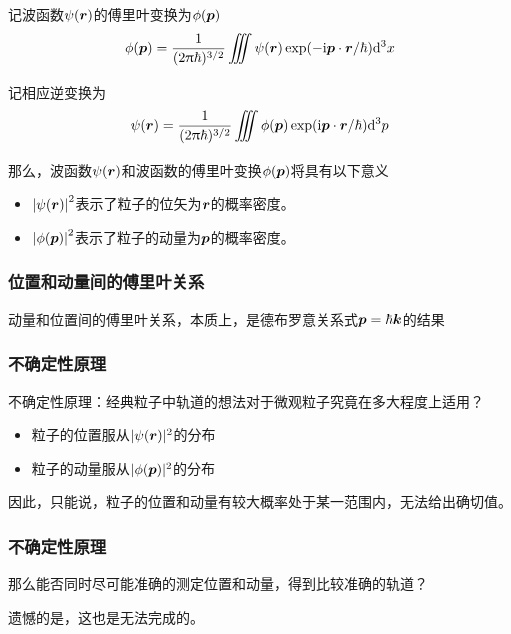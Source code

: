 \begin{frame}
    \begin{theorem}[波函数的傅里叶变换]
        \setlength{\parskip}{0pt}
        记波函数$\psi(\vb*{r})$的傅里叶变换为$\phi(\vb*{p})$
        \begin{equation}
            \phi(\vb*{p})=\frac{1}{(2\pi\hbar)^{3/2}}\Itnt\psi(\vb*{r})\exp(-\i\vb*{p}\cdot\vb*{r}/\hbar)\dd^3x
        \end{equation}
        记相应逆变换为
        \begin{equation}
            \psi(\vb*{r})=\frac{1}{(2\pi\hbar)^{3/2}}\Itnt\phi(\vb*{p})\exp(\i\vb*{p}\cdot\vb*{r}/\hbar)\dd^3p
        \end{equation}
        那么，波函数$\psi(\vb*{r})$和波函数的傅里叶变换$\phi(\vb*{p})$将具有以下意义
        \begin{itemize}
            \item $\abs{\psi(\vb*{r})}^2$表示了粒子的位矢为$\vb*{r}$的概率密度。
            \item $\abs{\phi(\vb*{p})}^2$表示了粒子的动量为$\vb*{p}$的概率密度。
        \end{itemize}
    \end{theorem}
\end{frame}

\begin{frame}
    \frametitle{位置和动量间的傅里叶关系}
    动量和位置间的傅里叶关系，本质上，是德布罗意关系式$\vb*{p}=\hbar\vb*{k}$的结果
\end{frame}

\begin{frame}
    \frametitle{不确定性原理}
    不确定性原理：经典粒子中轨道的想法对于微观粒子究竟在多大程度上适用？

    \begin{itemize}
        \item 粒子的位置服从$|\psi(\vb*{r})|^2$的分布
        \item 粒子的动量服从$|\phi(\vb*{p})|^2$的分布
    \end{itemize}
    因此，只能说，粒子的位置和动量有较大概率处于某一范围内，无法给出确切值。
\end{frame}

\begin{frame}
    \frametitle{不确定性原理}
    那么能否同时尽可能准确的测定位置和动量，得到比较准确的轨道？

    遗憾的是，这也是无法完成的。
\end{frame}

